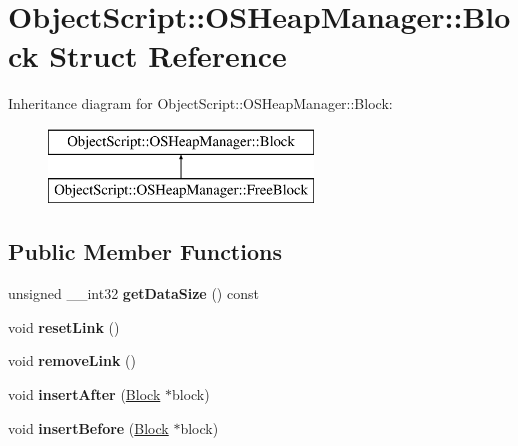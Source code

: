 \hypertarget{struct_object_script_1_1_o_s_heap_manager_1_1_block}{}\section{Object\+Script\+:\+:O\+S\+Heap\+Manager\+:\+:Block Struct Reference}
\label{struct_object_script_1_1_o_s_heap_manager_1_1_block}
Inheritance diagram for Object\+Script\+:\+:O\+S\+Heap\+Manager\+:\+:Block\+:\begin{figure}[H]
\begin{center}
\leavevmode
\includegraphics[height=2.000000cm]{struct_object_script_1_1_o_s_heap_manager_1_1_block}
\end{center}
\end{figure}
\subsection*{Public Member Functions}
\begin{DoxyCompactItemize}
\item 
unsigned \+\_\+\+\_\+int32 {\bfseries get\+Data\+Size} () const \hypertarget{struct_object_script_1_1_o_s_heap_manager_1_1_block_acef208e668bdb8adc5e373a59af675dc}{}\label{struct_object_script_1_1_o_s_heap_manager_1_1_block_acef208e668bdb8adc5e373a59af675dc}

\item 
void {\bfseries reset\+Link} ()\hypertarget{struct_object_script_1_1_o_s_heap_manager_1_1_block_a8a01bb7fa2a1552a4bd8b9e177806378}{}\label{struct_object_script_1_1_o_s_heap_manager_1_1_block_a8a01bb7fa2a1552a4bd8b9e177806378}

\item 
void {\bfseries remove\+Link} ()\hypertarget{struct_object_script_1_1_o_s_heap_manager_1_1_block_a575d0f97c4f1e94d54927fd9764a9390}{}\label{struct_object_script_1_1_o_s_heap_manager_1_1_block_a575d0f97c4f1e94d54927fd9764a9390}

\item 
void {\bfseries insert\+After} (\hyperlink{struct_object_script_1_1_o_s_heap_manager_1_1_block}{Block} $\ast$block)\hypertarget{struct_object_script_1_1_o_s_heap_manager_1_1_block_a4c654391214e9994826b7240d4371fdb}{}\label{struct_object_script_1_1_o_s_heap_manager_1_1_block_a4c654391214e9994826b7240d4371fdb}

\item 
void {\bfseries insert\+Before} (\hyperlink{struct_object_script_1_1_o_s_heap_manager_1_1_block}{Block} $\ast$block)\hypertarget{struct_object_script_1_1_o_s_heap_manager_1_1_block_a2b8edb11a61c7bf95f4388fb7c6a829e}{}\label{struct_object_script_1_1_o_s_heap_manager_1_1_block_a2b8edb11a61c7bf95f4388fb7c6a829e}

\end{DoxyCompactItemize}

